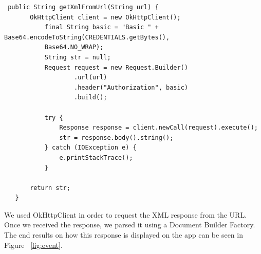 \documentclass[letterpaper,10pt,draftclsnofoot,onecolumn,titlepage]{IEEEtran}
\begin{document}
		\begin{lstlisting}
 public String getXmlFromUrl(String url) {
       OkHttpClient client = new OkHttpClient();
           final String basic = "Basic " + Base64.encodeToString(CREDENTIALS.getBytes(), 
           Base64.NO_WRAP);
           String str = null;
           Request request = new Request.Builder()
                   .url(url)
                   .header("Authorization", basic)
                   .build();

           try {
               Response response = client.newCall(request).execute();
               str = response.body().string();
           } catch (IOException e) {
               e.printStackTrace();
           }

       return str;
   }
   		\end{lstlisting}
		
		We used OkHttpClient in order to request the XML response from the URL. 
		Once we received the response, we parsed it using a Document Builder Factory. 
		The end results on how this response is displayed on the app can be seen in Figure ~\ref{fig:event}.
		
\end{document}
